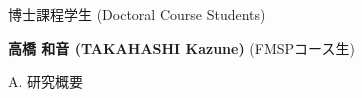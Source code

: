 \documentclass[a4j,twocolumn]{jarticle}
\begin{document}


博士課程学生 (Doctoral Course Students)



{\bf 高橋 和音 (TAKAHASHI Kazune)}
\hspace{5cm}(FMSPコース生)

%
%
%
%


\vspace{0.2cm}
\noindent
A. 研究概要

\vspace{0.1cm}
\end{document}
